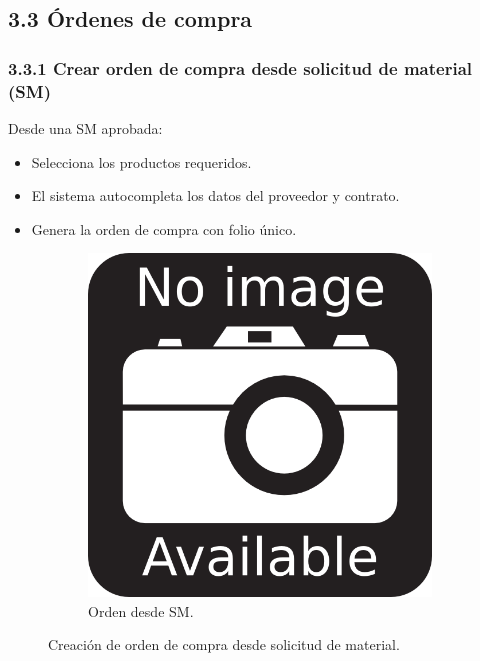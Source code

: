 \subsection{3.3 Órdenes de compra}

\subsubsection{3.3.1 Crear orden de compra desde solicitud de material (SM)}

Desde una SM aprobada:

\begin{itemize}
    \item Selecciona los productos requeridos.
    \item El sistema autocompleta los datos del proveedor y contrato.
    \item Genera la orden de compra con folio único.
\end{itemize}

\begin{figure}[h]
\centering
\begin{subfigure}{0.4\textwidth}
    \includegraphics[width=\textwidth]{imgs/no-image.png}
    \caption{Orden desde SM.}
    \label{fig:admin4}
\end{subfigure}
\caption{Creación de orden de compra desde solicitud de material.}
\end{figure}

